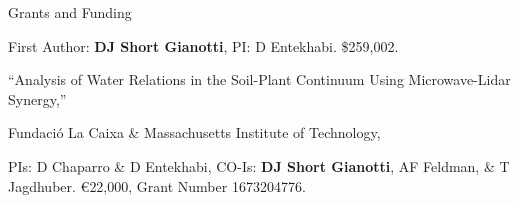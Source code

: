 \begin{rubric}{Grants and Funding}
\begin{hangparas}{1em}{1}
        \par First Author: \textbf{DJ Short Gianotti}, PI: D Entekhabi. \$259,002.
    \end{hangparas}
%
        \begin{hangparas}{1em}{1}
            \par ``Analysis of Water Relations in the Soil-Plant Continuum Using Microwave-Lidar Synergy,'' 
            \par Fundaci\'{o} La Caixa \& Massachusetts Institute of Technology, 
            \par PIs: D Chaparro \& D Entekhabi, CO-Is: \textbf{DJ Short Gianotti}, AF Feldman, \& T Jagdhuber. \euro{22,000}, Grant Number 1673204776.
        \end{hangparas}
%
\end{rubric}
